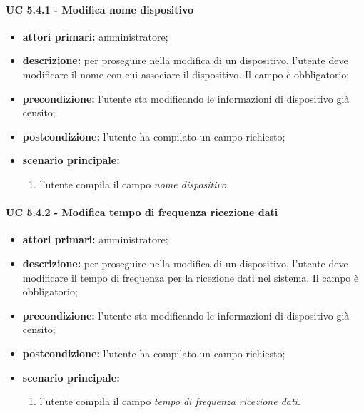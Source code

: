 
				\paragraph{UC 5.4.1 - Modifica nome dispositivo}
				\begin{itemize}
					\item \textbf{attori primari:} amministratore;
					\item \textbf{descrizione:} per proseguire nella modifica di un dispositivo, l'utente deve modificare il nome con cui associare il dispositivo. Il campo è obbligatorio;
					\item \textbf{precondizione:} l'utente sta modificando le informazioni di dispositivo già censito;
					\item \textbf{postcondizione:} l'utente ha compilato un campo richiesto;
					\item \textbf{scenario principale:}
					\begin{enumerate}
						\item{l'utente compila il campo \textit{nome dispositivo}.}
					\end{enumerate}
				\end{itemize}

				\paragraph{UC 5.4.2 - Modifica tempo di frequenza ricezione dati}
				\begin{itemize}
					\item \textbf{attori primari:} amministratore;
					\item \textbf{descrizione:} per proseguire nella modifica di un dispositivo, l'utente deve modificare il tempo di frequenza per la ricezione dati nel sistema. Il campo è obbligatorio;
					\item \textbf{precondizione:} l'utente sta modificando le informazioni di dispositivo già censito;
					\item \textbf{postcondizione:} l'utente ha compilato un campo richiesto;
					\item \textbf{scenario principale:}
					\begin{enumerate}
						\item{l'utente compila il campo \textit{tempo di frequenza ricezione dati}.}
					\end{enumerate}
				\end{itemize}

